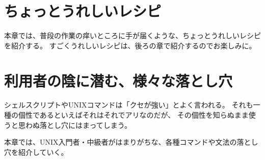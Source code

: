 \documentclass[b5paper,9pt,fleqn,tombow,openany]{jsbook}
\begin{document}

\frontmatter



\tableofcontents



\mainmatter

\chapter{ちょっとうれしいレシピ}

本章では、普段の作業の痒いところに手が届くような、ちょっとうれしいレシピを紹介する。
すごくうれしいレシピは、後ろの章で紹介するのでお楽しみに。



\chapter{利用者の陰に潜む、様々な落とし穴}

シェルスクリプトやUNIXコマンドは「クセが強い」とよく言われる。
それも一種の個性であるといえばそれはそれでアリなのだが、
その個性を知らぬまま使うと思わぬ落とし穴にはまってしまう。

本章では、UNIX入門者・中級者がはまりがちな、各種コマンドや文法の落とし穴を紹介していく。

\end{document}

